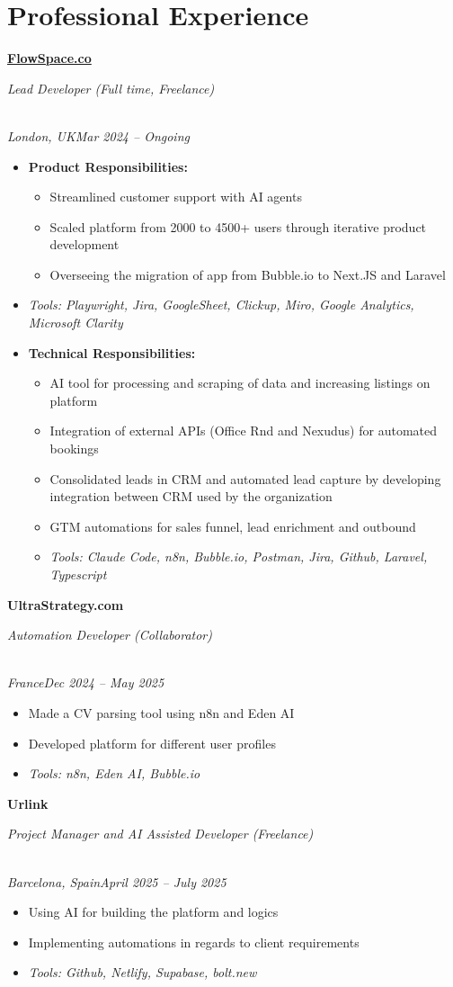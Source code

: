 \documentclass[a4paper,10pt]{article}
\newcommand{\role}[4]{\vspace{3pt}\noindent\hspace{0.6em}\parbox[t]{0.38\textwidth}{\raggedright\textbf{#1}}\hfill\parbox[t]{0.58\textwidth}{\raggedleft\textit{#2}}\\{\textit{#3}\hfill\textit{#4}}\vspace{1pt}}
\begin{document}
\section{Professional Experience}
\role{\href{https://flowspace.co}{FlowSpace.co}}{Lead Developer (Full time, Freelance)}{London, UK}{Mar 2024 -- Ongoing}
\begin{itemize}
\item \textbf{Product Responsibilities:}
\begin{itemize}[label=--]
\item Streamlined customer support with AI agents
\item Scaled platform from 2000 to 4500+ users through iterative product development
\item Overseeing the migration of app from Bubble.io to Next.JS and Laravel
\end{itemize}
\item \textit{Tools: Playwright, Jira, GoogleSheet, Clickup, Miro, Google Analytics, Microsoft Clarity}
\item \textbf{Technical Responsibilities:}
\begin{itemize}[label=--]
\item AI tool for processing and scraping of data and increasing listings on platform
\item Integration of external APIs (Office Rnd and Nexudus) for automated bookings
\item Consolidated leads in CRM and automated lead capture by developing integration between CRM used by the organization
\item GTM automations for sales funnel, lead enrichment and outbound
\item \textit{Tools: Claude Code, n8n, Bubble.io, Postman, Jira, Github, Laravel, Typescript}
\end{itemize}
\end{itemize}

\role{UltraStrategy.com}{Automation Developer (Collaborator)}{France}{Dec 2024 -- May 2025}
\begin{itemize}
\item Made a CV parsing tool using n8n and Eden AI
\item Developed platform for different user profiles
\item \textit{Tools: n8n, Eden AI, Bubble.io}
\end{itemize}

\role{Urlink}{Project Manager and AI Assisted Developer (Freelance)}{Barcelona, Spain}{April 2025 -- July 2025}
\begin{itemize}
\item Using AI for building the platform and logics
\item Implementing automations in regards to client requirements
\item \textit{Tools: Github, Netlify, Supabase, bolt.new}
\end{itemize}
\end{document}
